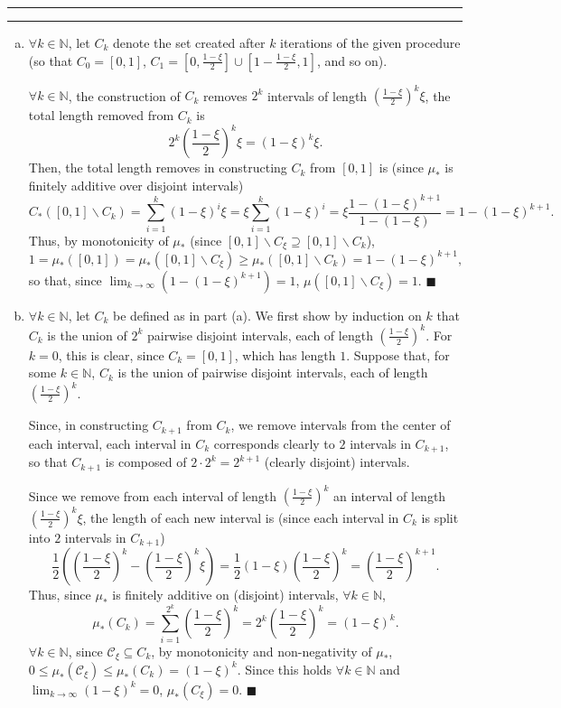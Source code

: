 \documentclass[11pt]{article}
\newcounter{questionCounter}
\newcounter{partCounter}[questionCounter]
\newenvironment{question}[2][\arabic{questionCounter}]{%
    \setcounter{partCounter}{0}%
    \vspace{.25in} \hrule \vspace{0.5em}%
        \noindent{\bf #2}%
    \vspace{0.8em} \hrule \vspace{.10in}%
    \addtocounter{questionCounter}{1}%
}{}
\renewcommand{\qed}{\quad $\blacksquare$}
\newcommand{\sminus}{\backslash}
\newcommand{\N}{\mathbb{N}} %
\newcommand{\C}{\mathcal{C}} %
\begin{document}
\newpage
\begin{question}{Chapter 1, Problem 3}
\begin{enumerate}[(a)]
\item $\forall k \in \N$, let $C_k$ denote the set created after $k$
iterations of the given procedure (so that $C_0 = [0,1]$,
$C_1 = [0,\frac{1 - \xi}{2}] \cup [1 - \frac{1 - \xi}{2}, 1]$, and so on).

$\forall k \in \N$, the construction of $C_k$ removes $2^k$ intervals of
length 
$\left( \frac{1 - \xi}{2} \right)^k\xi$, the total length removed from
$C_k$ is
\[2^k \left( \frac{1 - \xi}{2} \right)^k \xi
 = (1 - \xi)^k \xi.
\]
Then, the total length removes in constructing $C_k$ from $[0,1]$ is (since
$\mu_*$ is finitely additive over disjoint intervals)
\[
C_*([0,1] \sminus C_k)
 = \sum_{i = 1}^k (1 - \xi)^i\xi
 = \xi \sum_{i = 1}^k (1 - \xi)^i
 = \xi \frac{1 - (1 - \xi)^{k + 1}}{1 - (1 - \xi)}
 = 1 - (1 - \xi)^{k + 1}.
\]
Thus, by monotonicity of $\mu_*$ (since
$[0,1] \sminus C_{\xi} \supseteq [0,1] \sminus C_k$),
\[1
 = \mu_*([0,1])
 = \mu_*([0,1] \sminus C_{\xi})
 \geq \mu_*([0,1] \sminus C_k)
 = 1 - (1 - \xi)^{k + 1}
,\]
so that, since $\lim_{k \rightarrow \infty} (1 - (1 - \xi)^{k + 1}) = 1$,
$\mu([0,1] \sminus C_{\xi}) = 1$. \qed

\item $\forall k \in \N$, let $C_k$ be defined as in part (a). We first show
by induction on $k$ that $C_k$ is the union of $2^k$ pairwise disjoint
intervals, each of length $\left( \frac{1 - \xi}{2} \right)^k$.
For $k = 0$, this is clear, since $C_k = [0,1]$, which has length $1$.
Suppose that, for some $k \in \N$, $C_k$ is the union of pairwise disjoint
intervals, each of length $\left( \frac{1 - \xi}{2} \right)^k$.

Since, in constructing $C_{k + 1}$ from $C_k$,
we remove intervals from the center of each interval, each interval in
$C_k$ corresponds clearly to $2$ intervals in $C_{k + 1}$, so that $C_{k + 1}$
is composed of $2 \cdot 2^k = 2^{k + 1}$ (clearly disjoint) intervals.

Since
we remove from each interval of length
$\left( \frac{1 - \xi}{2} \right)^k$ an interval of length
$\left( \frac{1 - \xi}{2} \right)^k\xi$, the length of each new interval is
(since each interval in $C_k$ is split into $2$ intervals in $C_{k + 1}$)
\[
\frac12 \left( \left( \frac{1 - \xi}{2} \right)^k - \left( \frac{1 - \xi}{2} \right)^k\xi \right)
 = \frac12 (1 - \xi) \left( \frac{1 - \xi}{2} \right)^k
 = \left( \frac{1 - \xi}{2} \right)^{k + 1}.
\]
Thus, since $\mu_*$ is finitely additive on (disjoint) intervals,
$\forall k \in \N$,
\[\mu_*(C_k)
 = \sum_{i = 1}^{2^k} \left( \frac{1 - \xi}{2} \right)^k
 = 2^k \left( \frac{1 - \xi}{2} \right)^k
 = (1 - \xi)^k.
\]
$\forall k \in \N$, since $\C_{\xi} \subseteq C_k$, by monotonicity and
non-negativity of $\mu_*$,
$0 \leq \mu_*(\C_{\xi}) \leq \mu_*(C_k) = (1 - \xi)^k$.
Since this holds $\forall k \in \N$ and
$\lim_{k \rightarrow \infty} (1 - \xi)^k = 0$, $\mu_*(C_{\xi}) = 0$. \qed

\end{enumerate}
\end{question}
\end{document}
